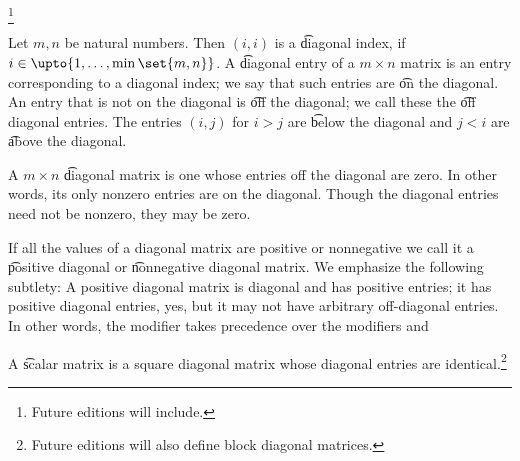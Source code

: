 
\footnote{Future editions will include.}


Let $m, n$ be natural numbers.
Then $(i, i)$ is a \t{diagonal index}, if $i \in \upto{1, \dots, \min\set{m, n}}$.
A \t{diagonal entry} of a $m \times n$ matrix is an entry corresponding to a diagonal index; we say that such entries are \t{on the diagonal}.
An entry that is not on the diagonal is \t{off the diagonal}; we call these the \t{off diagonal entries}.
The entries $(i, j)$ for $i > j$ are \t{below the diagonal} and $j < i$ are \t{above the diagonal}.

A $m \times n$ \t{diagonal} matrix is one whose entries off the diagonal are zero.
In other words, its only nonzero entries are on the diagonal.
Though the diagonal entries need not be nonzero, they may be zero.

If all the values of a diagonal matrix are positive or nonnegative we call it a \t{positive diagonal} or \t{nonnegative diagonal} matrix.
We emphasize the following subtlety: A positive diagonal matrix is diagonal and has positive entries; it has positive diagonal entries, yes, but it may not have arbitrary off-diagonal entries.
In other words, the modifier  takes precedence over the modifiers  and 

A \t{scalar matrix} is a square diagonal matrix whose diagonal entries are identical.\footnote{Future editions will also define block diagonal matrices.}

\blankpage

